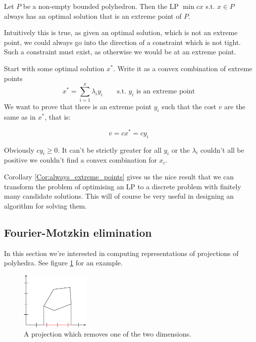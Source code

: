 \begin{cor}\label{Cor:always_extreme_points} Let $P$ be a non-empty bounded polyhedron. Then the LP $\min cx$ s.t. $x\in P$ always has an optimal solution that is an extreme point of $P$.
\end{cor}

Intuitively this is true, as given an optimal solution, which is not an extreme point, we could always go into the direction of a constraint which is not tight. Such a constraint must exist, as otherwise we would be at an extreme point. 

\begin{pr} %
Start with some optimal solution $x^*$. Write it as a convex combination of extreme points 
\[x^* = \sum_{i=1}^x \lambda_i y_i \qquad \text{s.t. } y_i \text{ is an extreme point}\]
We want to prove that there is an extreme point $y_i$ such that the cost $v$ are the same as in $x^{*}$, that is:

\[v = cx^* = cy_i\]

Obviously %
$cy_i\geq 0$. It can't be strictly greater for all $y_i$ or the $\lambda_i$ couldn't all be positive we couldn't find a convex combination for $x_i$. 
\end{pr}

Corollary \ref{Cor:always_extreme_points} gives us the nice result that we can transform the problem of optimising an LP to a discrete problem with finitely many candidate solutions. This will of course be very useful in designing an algorithm for solving them.

\subsection*{Fourier-Motzkin elimination}

In this section we're interested in computing representations of projections of polyhedra. See figure \ref{Fig:polyhedron_proj} for an example.

\begin{figure}[hbt]
\begin{center}
\includegraphics[width=0.3\textwidth]{./images/polyhedron_proj.pdf}
\end{center}
\caption{A projection which removes one of the two dimensions.}
\label{Fig:polyhedron_proj}
\end{figure}

